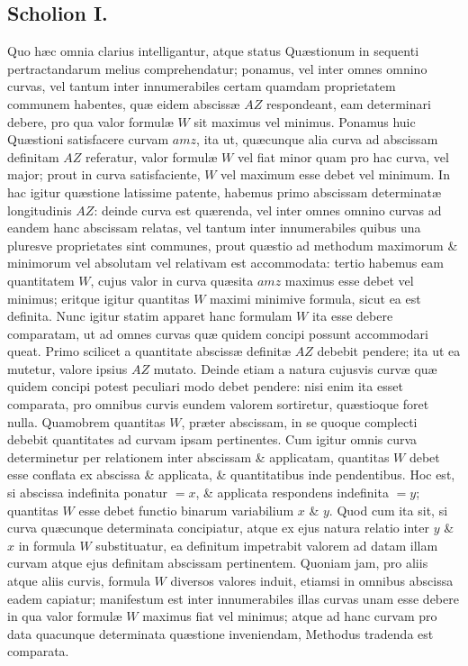 \subsection*{Scholion I.}
Quo hæc omnia clarius intelligantur, atque status Quæstionum in sequenti pertractandarum melius comprehendatur; ponamus, vel inter omnes omnino curvas, vel tantum inter innumerabiles certam quamdam proprietatem communem habentes, quæ eidem abscissæ $AZ$ respondeant, eam determinari debere,
pro qua valor formulæ $W$ sit maximus vel minimus. Ponamus huic Quæstioni satisfacere curvam $amz$, ita ut, quæcunque alia curva ad abscissam definitam $AZ$ referatur, valor formulæ $W$ vel fiat minor quam pro hac curva, vel major; prout in curva satisfaciente, $W$ vel maximum esse debet vel minimum. In hac igitur quæstione latissime patente, habemus primo abscissam determinatæ longitudinis $AZ$: deinde curva est quærenda, vel inter omnes omnino curvas ad eandem hanc abscissam relatas, vel tantum inter innumerabiles quibus una pluresve proprietates sint communes, prout quæstio ad methodum maximorum \& minimorum vel absolutam vel relativam est accommodata: tertio habemus eam quantitatem $W$, cujus valor in curva quæsita $amz$ maximus esse debet vel minimus; eritque igitur quantitas $W$ maximi minimive formula, sicut ea est definita. Nunc igitur statim apparet hanc formulam $W$ ita esse debere comparatam, ut ad omnes curvas quæ quidem concipi possunt accommodari queat. Primo scilicet a quantitate abscissæ definitæ $AZ$ debebit pendere; ita ut ea mutetur, valore ipsius $AZ$ mutato. Deinde etiam a natura cujusvis curvæ quæ quidem concipi potest peculiari modo debet pendere: nisi enim ita esset comparata, pro omnibus curvis eundem valorem sortiretur, quæstioque foret nulla. Quamobrem quantitas $W$, præter abscissam, in se quoque complecti debebit quantitates ad curvam ipsam pertinentes. Cum igitur omnis curva determinetur per relationem inter abscissam \& applicatam, quantitas $W$ debet esse conflata ex abscissa \& applicata, \& quantitatibus inde pendentibus. Hoc est, si abscissa indefinita ponatur $=x$, \& applicata respondens indefinita $=y$; quantitas $W$ esse debet functio binarum variabilium $x$ \& $y$. Quod cum ita sit, si curva quæcunque determinata concipiatur, atque ex ejus natura relatio inter $y$ \& $x$ in formula $W$ substituatur, ea definitum impetrabit valorem ad datam illam curvam atque ejus definitam abscissam pertinentem. Quoniam jam, pro aliis atque aliis curvis, formula $W$ diversos valores induit, etiamsi in omnibus abscissa eadem capiatur; manifestum est inter innumerabiles illas curvas unam esse debere in qua valor formulæ $W$ maximus fiat vel minimus; atque ad hanc curvam pro data quacunque determinata quæstione inveniendam, Methodus tradenda est comparata.


